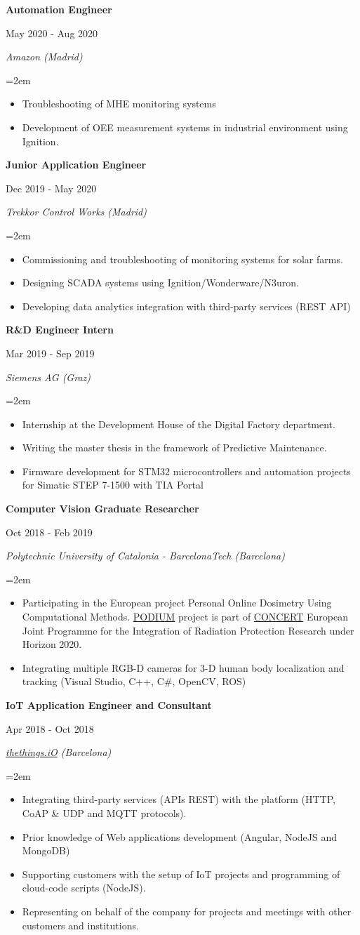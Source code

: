 \documentclass[10pt,a4paper,oneside]{book}
\newcommand{\sepspace}{\vspace*{0pt}}		%
\newcommand{\EducationEntrya}[4]{\noindent\ignorespaces	
		\begin{minipage}[t][][b]{0.8\textwidth} \raggedright{\textbf{#1}} \end{minipage} \hfill 
		\begin{minipage}[t][][b]{0.2\textwidth} \hfill\color{Black}#2\end{minipage} 
		 
		\noindent \textit{#3} \par        %
		\noindent\hangindent=2em\hangafter=0 \small #4 
		\normalsize \par}
\begin{document}
\EducationEntrya{Automation Engineer}{May 2020 - Aug 2020}{Amazon (Madrid)}{\begin{itemize}
    \item Troubleshooting of MHE monitoring systems
    \item Development of OEE measurement systems in industrial environment using Ignition.
\end{itemize}}
\sepspace

\EducationEntrya{Junior Application Engineer}{Dec 2019 - May 2020}{Trekkor Control Works (Madrid)}{\begin{itemize}
\item Commissioning and troubleshooting of monitoring systems for solar farms.
\item Designing SCADA systems using Ignition/Wonderware/N3uron.
\item Developing data analytics integration with third-party services (REST API)
\end{itemize}}
\sepspace

\EducationEntrya{R\&D Engineer Intern}{Mar 2019 - Sep 2019}{Siemens AG (Graz)}{\begin{itemize} 
\item Internship at the Development House of the Digital Factory department. 
\item Writing the master thesis in the framework of Predictive Maintenance.
\item Firmware development for STM32 microcontrollers and automation projects for Simatic STEP 7-1500 with TIA Portal\end{itemize}}
\sepspace

\EducationEntrya{Computer Vision Graduate Researcher}{Oct 2018 - Feb 2019}{Polytechnic University of Catalonia - BarcelonaTech (Barcelona)}{\begin{itemize} 
\item Participating in the European project Personal Online Dosimetry Using Computational Methods. \href{https://podium-concerth2020.eu}{PODIUM} project is part of \href{http://www.concert-h2020.eu/}{CONCERT} European Joint Programme for the Integration of Radiation Protection Research under Horizon 2020.
\item Integrating multiple RGB-D cameras for 3-D human body localization and tracking (Visual Studio, C++, C\#, OpenCV, ROS)
\end{itemize}}
\sepspace

\EducationEntrya{IoT Application Engineer and Consultant}{Apr 2018 - Oct 2018}{\href{https://thethings.io/}{thethings.iO} (Barcelona)}{\begin{itemize} 
\item Integrating third-party services (APIs REST) with the platform (HTTP, CoAP \& UDP and MQTT protocols).
\item Prior knowledge of Web applications development (Angular, NodeJS and MongoDB)
\item Supporting customers with the setup of IoT projects and programming of cloud-code scripts (NodeJS).
\item Representing on behalf of the company for projects and meetings with other customers and institutions.
\end{itemize}}
\sepspace
\end{document}
